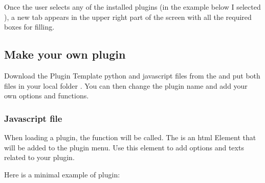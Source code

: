 \documentclass[letterpaper,10pt,english,openany,oneside]{sphinxmanual}
\begin{document}
\sphinxAtStartPar
Once the user selects any of the installed plugins (in the example below I selected ), a new tab  appears in the upper right part of the screen with all the required boxes for filling.

\sphinxAtStartPar
{}


\subsection{Make your own plugin}
\label{\detokenize{docs/starting/plugins:make-your-own-plugin}}
\sphinxAtStartPar
Download the Plugin Template python and javascript files from the  and put both files in your local folder . You can then change the plugin name and add your own options and functions.


\subsubsection{Javascript file}
\label{\detokenize{docs/starting/plugins:javascript-file}}
\sphinxAtStartPar
When loading a plugin, the function  will be called. The  is an html Element that will be added to the plugin menu. Use this element to add options and texts related to your plugin.

\sphinxAtStartPar
{}

\sphinxAtStartPar
Here is a minimal example of plugin:

\begin{sphinxVerbatim}[commandchars=\\\{\}]
\end{sphinxVerbatim}
\end{document}
